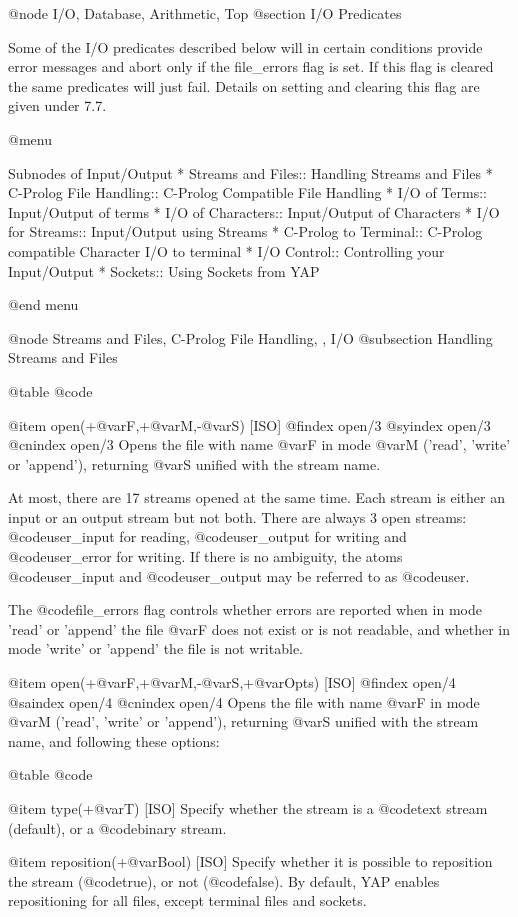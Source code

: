 {{{{@node I/O, Database, Arithmetic, Top
@section I/O Predicates

Some of the I/O predicates described below will in certain conditions
provide error messages and abort only if the file_errors flag is set.
If this flag is cleared the same predicates will just fail. Details on
setting and clearing this flag are given under 7.7.

@menu

Subnodes of Input/Output
* Streams and Files:: Handling Streams and Files
* C-Prolog File Handling:: C-Prolog Compatible File Handling
* I/O of Terms:: Input/Output of terms
* I/O of Characters:: Input/Output of Characters
* I/O for Streams:: Input/Output using Streams
* C-Prolog to Terminal:: C-Prolog compatible Character I/O to terminal
* I/O Control:: Controlling your Input/Output
* Sockets:: Using Sockets from YAP

@end menu

@node Streams and Files, C-Prolog File Handling, , I/O
@subsection Handling Streams and Files

@table @code

@item open(+@var{F},+@var{M},-@var{S}) [ISO]
@findex open/3
@syindex open/3
@cnindex open/3
Opens the file with name @var{F} in mode @var{M} ('read', 'write' or
'append'), returning @var{S} unified with the stream name.

At most, there are 17 streams  opened at the same time. Each stream is
either an input or an output stream but not both. There are always 3
open streams:  @code{user_input} for reading, @code{user_output} for writing
and @code{user_error} for writing. If there is no  ambiguity, the atoms
@code{user_input} and @code{user_output} may be referred to as  @code{user}.

The @code{file_errors} flag controls whether errors are reported when in
mode 'read' or 'append' the file @var{F} does not exist or is not
readable, and whether in mode 'write' or 'append' the file is not
writable.

@item open(+@var{F},+@var{M},-@var{S},+@var{Opts}) [ISO]
@findex open/4
@saindex open/4
@cnindex open/4
Opens the file with name @var{F} in mode @var{M} ('read',  'write' or
'append'), returning @var{S} unified with the stream name, and following
these options:

@table @code

@item type(+@var{T}) [ISO]
Specify whether the stream is a @code{text} stream (default), or a
@code{binary} stream.

@item reposition(+@var{Bool}) [ISO]
Specify whether it is possible to reposition the stream (@code{true}), or
not (@code{false}). By default, YAP enables repositioning for all
files, except terminal files and sockets.

}}}}
